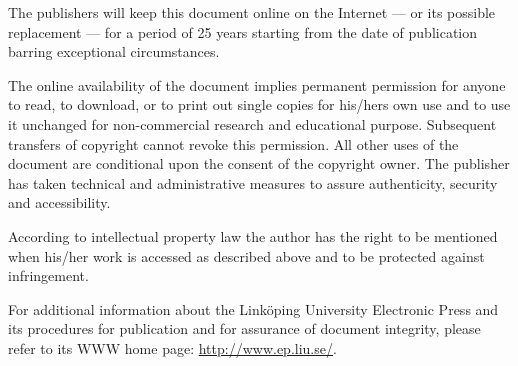 
The publishers will keep this document online on the Internet --- or its possible replacement --- for a period of 25 years starting from the date of publication barring exceptional circumstances.

The online availability of the document implies permanent permission for anyone to read, to download, or to print out single copies for his/hers own use and to use it unchanged for non-commercial research and educational purpose. Subsequent transfers of copyright cannot revoke this permission. All other uses of the document are conditional upon the consent of the copyright owner. The publisher has taken technical and administrative measures to assure authenticity, security and accessibility.

According to intellectual property law the author has the right to be mentioned when his/her work is accessed as described above and to be protected against infringement.

For additional information about the Linköping University Electronic Press and its procedures for publication and for assurance of document integrity, please refer to its WWW home page: \url{http://www.ep.liu.se/}.
